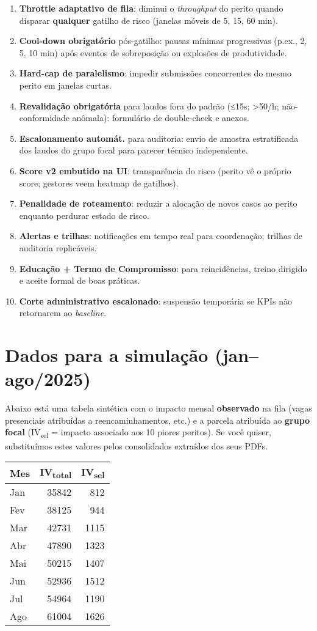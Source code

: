 \documentclass[11pt]{article}
\begin{document}
\begin{enumerate}
\item \textbf{Throttle adaptativo de fila}: diminui o \emph{throughput} do perito quando disparar \textbf{qualquer} gatilho de risco (janelas móveis de 5, 15, 60 min).
\item \textbf{Cool-down obrigatório} pós-gatilho: pausas mínimas progressivas (p.ex., 2, 5, 10 min) após eventos de sobreposição ou explosões de produtividade.
\item \textbf{Hard-cap de paralelismo}: impedir submissões concorrentes do mesmo perito em janelas curtas.
\item \textbf{Revalidação obrigatória} para laudos fora do padrão (≤15s; >50/h; não-conformidade anômala): formulário de double-check e anexos.
\item \textbf{Escalonamento automát.} para auditoria: envio de amostra estratificada dos laudos do grupo focal para parecer técnico independente.
\item \textbf{Score v2 embutido na UI}: transparência do risco (perito vê o próprio score; gestores veem heatmap de gatilhos).
\item \textbf{Penalidade de roteamento}: reduzir a alocação de novos casos ao perito enquanto perdurar estado de risco.
\item \textbf{Alertas e trilhas}: notificações em tempo real para coordenação; trilhas de auditoria replicáveis.
\item \textbf{Educação + Termo de Compromisso}: para reincidências, treino dirigido e aceite formal de boas práticas.
\item \textbf{Corte administrativo escalonado}: suspensão temporária se KPIs não retornarem ao \emph{baseline}.
\end{enumerate}

\section{Dados para a simulação (jan–ago/2025)}
\label{sec:org1eacd92}
Abaixo está uma tabela sintética com o impacto mensal \textbf{observado} na fila (vagas presenciais atribuídas a reencaminhamentos, etc.) e a parcela atribuída ao \textbf{grupo focal} (IV\textsubscript{sel} = impacto associado aos 10 piores peritos). Se você quiser, substituímos estes valores pelos consolidados extraídos dos seus PDFs.

\begin{table}[htbp]
\label{tab:org3ebcb91}
\centering
\begin{tabular}{lrr}
Mes & IV\textsubscript{total} & IV\textsubscript{sel}\\
\hline
Jan & 35842 & 812\\
Fev & 38125 & 944\\
Mar & 42731 & 1115\\
Abr & 47890 & 1323\\
Mai & 50215 & 1407\\
Jun & 52936 & 1512\\
Jul & 54964 & 1190\\
Ago & 61004 & 1626\\
\end{tabular}
\end{table}
\end{document}
